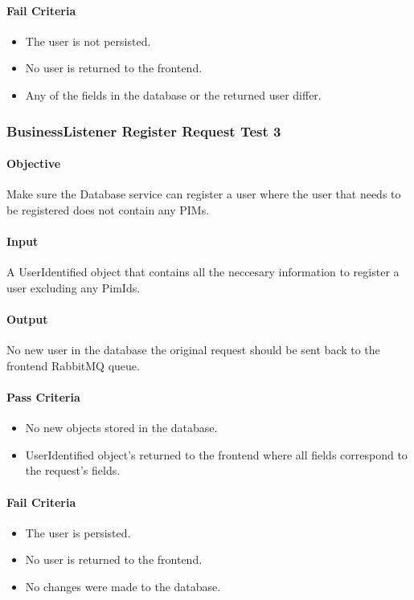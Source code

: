 \documentclass[hidelinks,english]{article}
\begin{document}
				\paragraph{Fail Criteria}
				\begin{itemize}
					\item The user is not persisted.
					\item No user is returned to the frontend.
					\item Any of the fields in the database or the returned user differ.
				\end{itemize}
				
			\subsubsection{BusinessListener Register Request Test 3}\label{databasebusinesslistenerregistertest3}
				\paragraph{Objective} Make sure the Database service can register a user where the user that needs to be registered does not contain any PIMs.
				\paragraph{Input} A UserIdentified object that contains all the neccesary information to register a user excluding any PimIds.
				\paragraph{Output} No new user in the database the original request should be sent back to the frontend RabbitMQ queue.
				\paragraph{Pass Criteria}
				\begin{itemize}
					\item No new objects stored in the database.
					\item UserIdentified object's returned to the frontend where all fields correspond to the request's fields.
				\end{itemize}
				\paragraph{Fail Criteria}
				\begin{itemize}
					\item The user is persisted.
					\item No user is returned to the frontend.
					\item No changes were made to the database.
				\end{itemize}
				
\end{document}
